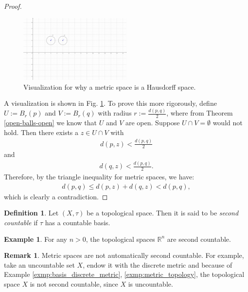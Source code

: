 \documentclass[12pt, a4paper]{article}
\numberwithin{equation}{section}
\theoremstyle{definition}
\theoremstyle{definition}
\newtheorem{defn}[thm]{Definition} %
\newtheorem{exmp}[thm]{Example} %
\newtheorem{remark}[thm]{Remark} %
\begin{document}
		\begin{proof}
			\begin{figure}[h!]		
				\centering 
				\includegraphics[trim = {3.8cm 5.8cm 9.7cm 2.8cm}, width=0.5\textwidth, clip]{Figures/metric-spaces-Hausdorff-spaces-v2.png}
				\caption{Visualization for why a metric space is a Hausdorff space.}
				\label{metric-space-Hausdorff-space}
			\end{figure} 
			A visualization is shown in Fig. \ref{metric-space-Hausdorff-space}. To prove this more rigorously, define $U := B_{r}(p)$ and $V:=B_{r}(q)$ with radius $r := \frac{d(p, q)}{2}$, where from Theorem \ref{open-balls-open} we know that $U$ and $V$ are open. Suppose $U\cap V = \emptyset$ would not hold. Then there exists a $z\in U\cap V$ with 
			\begin{align}
				d(p, z) < \frac{d(p, q)}{2}
			\end{align}
			and 
			\begin{align}
				d(q, z) < \frac{d(p, q)}{2}. 
			\end{align}
			Therefore, by the triangle inequality for metric spaces, we have: 
			\begin{align}
				d(p, q) \leq d(p, z) + d(q, z) < d(p, q), 
			\end{align}
			which is clearly a contradiction. 
		\end{proof}
		
		\begin{defn}
			Let $(X, \tau)$ be a topological space. Then it is said to be \textit{second countable} if $\tau$ has a countable basis. 
		\end{defn}
		
		\begin{exmp}
			For any $n > 0$, the topological spaces $\mathbb R^n$ are second countable. 
		\end{exmp}
		
		\begin{remark}
			Metric spaces are not automatically second countable. For example, take an uncountable set $X$, endow it with the discrete metric and because of Example \ref{exmp:basis_discrete_metric}, \ref{exmp:metric_topology},  the topological space $X$ is not second countable, since $X$ is uncountable. 
		\end{remark}	
	
\end{document}
